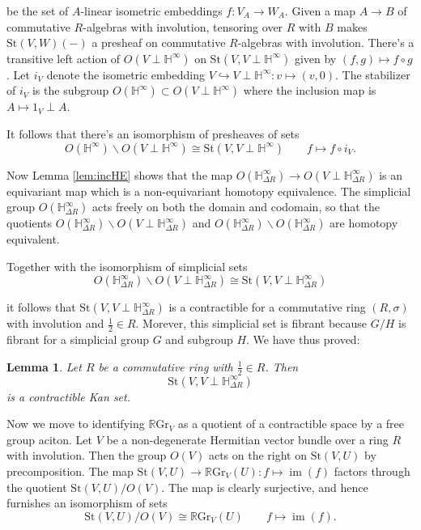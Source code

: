 \documentclass[edeposit,fullpage]{uiucthesis2009}
\newcommand{\mbb}{\mathbb}
\newcommand{\RGr}{\mathbb R\mathrm{Gr}}
\newcommand{\St}{\mathrm{St}}
\DeclareMathOperator*{\im}{im}
\theoremstyle{plain}
\newtheorem{lemma}{Lemma}
\numberwithin{lemma}{section}
\theoremstyle{definition}
\begin{document}
be the set of $A$-linear isometric embeddings $f : V_A \rightarrow
W_A$. Given a map $A \rightarrow B$ of commutative $R$-algebras with involution, tensoring over $R$ with $B$ makes
$\St(V,W)(-)$ a presheaf on commutative $R$-algebras with involution. There's a
transitive left action of $O(V \perp \mbb H^\infty)$ on $\St(V,V \perp \mbb
H^\infty)$ given by $(f,g) \mapsto f \circ g$. Let $i_V$ denote the
isometric embedding $V \hookrightarrow V \perp \mbb H^\infty : v
\mapsto (v,0)$. The stabilizer of $i_V$ is the subgroup $O(\mbb
H^\infty) \subset O(V \perp \mbb H^\infty)$ where the inclusion map is
$A \mapsto 1_V \perp A$.

It follows that there's an isomorphism of presheaves of sets 
\[
O(\mbb H^\infty)\backslash O(V \perp \mbb  H^\infty) \cong
\St(V,V\perp \mbb H^\infty) \qquad f \mapsto f \circ i_V.
\]

Now Lemma \ref{lem:incHE} shows that the map $O(\mbb H^\infty_{\Delta
  R}) \rightarrow O(V \perp \mbb H^\infty_{\Delta R})$ is an
equivariant map which is a non-equivariant homotopy equivalence. The
simplicial group $O(\mbb H^\infty_{\Delta R})$ acts freely on both the
domain and codomain, so that the quotients $O(\mbb H^\infty_{\Delta
  R})\backslash O(V \perp \mbb H^\infty_{\Delta R})$ and $O(\mbb H^\infty_{\Delta
  R})\backslash O(\mbb H^\infty_{\Delta R})$ are homotopy equivalent.

Together with the isomorphism of simplicial sets
\[
O(\mbb H^\infty_{\Delta
  R})\backslash O(V \perp \mbb H^\infty_{\Delta R}) \cong \St(V,V
\perp \mbb H^\infty_{\Delta R})
\]

it follows that $\St(V,V\perp \mbb H^\infty_{\Delta R})$ is a
contractible for a commutative ring $(R,\sigma)$ with involution and
$\frac{1}{2} \in R$. Morever, this simplicial set is fibrant because
$G/H$ is fibrant for a simplicial group $G$ and subgroup $H$. We have
thus proved:

\begin{lemma}\label{lem:St_contrac}
Let $R$ be a commutative ring with $\frac{1}{2} \in R$. Then 
\[
\St(V,V\perp \mbb H^\infty_{\Delta R})
\]
is a contractible Kan set.
\end{lemma}

Now we move to identifying $\RGr_V$ as a quotient of a contractible
space by a free group aciton. Let $V$ be a non-degenerate Hermitian
vector bundle over a ring $R$ with involution. Then the group $O(V)$
acts on the right on $\St(V,U)$ by precomposition. The map $\St(V,U)
\rightarrow \RGr_V(U) : f \mapsto \im(f)$ factors through the quotient
$\St(V,U)/O(V)$. The map is clearly surjective, and hence furnishes an
isomorphism of sets
\[
\St(V,U)/O(V) \cong \RGr_V(U) \qquad f \mapsto \im(f).
\]
\end{document}
